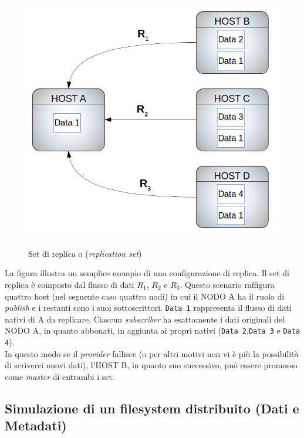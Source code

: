 \begin{figure}[htbp]
\centering
\includegraphics[scale=0.60]{img/setreplica.png}\\
\caption{Set di replica o (\textit{replication set}) \label{figura1.15}}
\end{figure}




La figura illustra un semplice esempio di una configurazione di replica. Il set di replica \`{e} composto dal flusso di dati $R_1$, $R_2$ e $R_3$.
Questo scenario raffigura quattro host (nel seguente caso quattro nodi) in cui il NODO A ha il ruolo di \textit{publish} e i restanti sono i suoi sottoscrittori.
\verb"Data 1" rappresenta il flusso di dati nativi di A da replicare. Ciascun \textit{subscriber} ha esattamente i dati originali del NODO A, in quanto abbonati, in aggiunta ai propri nativi (\verb"Data 2",\verb"Data 3" e \verb"Data 4"). \\
In questo modo se il \textit{provider} fallisce (o per altri motivi non vi \`{e} pi\`{u} la possibilit\`{a} di scriverci nuovi dati), l'HOST B, in quanto suo successivo, pu\`{o} essere promosso come \textit{master} di entrambi i set.

\subsection{Simulazione di un filesystem distribuito (Dati e Metadati)}

